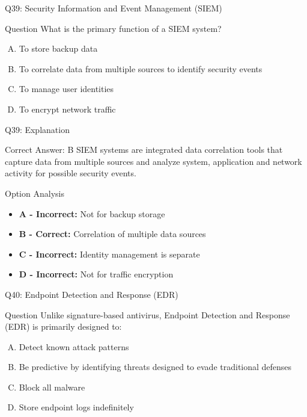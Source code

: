 \documentclass{beamer}
\begin{document}
	\begin{frame}{Q39: Security Information and Event Management (SIEM)}
		\begin{block}{Question}
			What is the primary function of a SIEM system?
		\end{block}
		\begin{enumerate}[(A)]
			\item To store backup data
			\item To correlate data from multiple sources to identify security events
			\item To manage user identities
			\item To encrypt network traffic
		\end{enumerate}
	\end{frame}
	
	\begin{frame}{Q39: Explanation}
		\begin{block}{Correct Answer: B}
			SIEM systems are integrated data correlation tools that capture data from multiple sources and analyze system, application and network activity for possible security events.
		\end{block}
		\begin{block}{Option Analysis}
			\begin{itemize}
				\item \textbf{A - Incorrect:} Not for backup storage
				\item \textbf{B - Correct:} Correlation of multiple data sources
				\item \textbf{C - Incorrect:} Identity management is separate
				\item \textbf{D - Incorrect:} Not for traffic encryption
			\end{itemize}
		\end{block}
	\end{frame}
	
	\begin{frame}{Q40: Endpoint Detection and Response (EDR)}
		\begin{block}{Question}
			Unlike signature-based antivirus, Endpoint Detection and Response (EDR) is primarily designed to:
		\end{block}
		\begin{enumerate}[(A)]
			\item Detect known attack patterns
			\item Be predictive by identifying threats designed to evade traditional defenses
			\item Block all malware
			\item Store endpoint logs indefinitely
		\end{enumerate}
	\end{frame}
	
\end{document}
